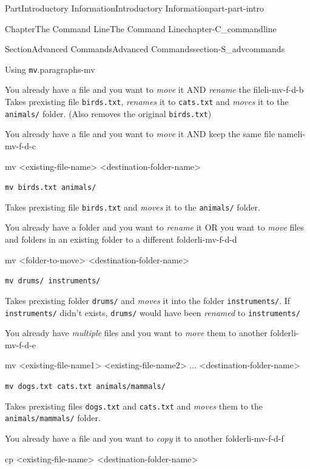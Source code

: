 \documentclass[oneside,10pt,]{book}
\newcommand{\mono}[1]{\texttt{#1}}
\begin{document}
\begin{partptx}{Part}{Introductory Information}{}{Introductory Information}{}{}{part-part-intro}
\begin{chapterptx}{Chapter}{The Command Line}{}{The Command Line}{}{}{chapter-C_commandline}
\begin{sectionptx}{Section}{Advanced Commands}{}{Advanced Commands}{}{}{section-S_advcommands}
\begin{paragraphs}{Using \mono{mv}.}{paragraphs-mv}
\begin{descriptionlist}
\begin{dlinarrow}{You already have a file and you want to \emph{move} it AND \emph{rename} the file}{li-mv-f-d-b}
Takes prexisting file \mono{birds.txt}, \emph{renames} it to \mono{cats.txt} and \emph{moves} it to the \mono{animals/} folder. (Also removes the original \mono{birds.txt})%
\end{dlinarrow}%
\begin{dlinarrow}{You already have a file and you want to \emph{move} it AND keep the same file name}{li-mv-f-d-c}%
%
\begin{codedisplay}
mv <existing-file-name> <destination-folder-name>
\end{codedisplay}
%
\par
\mono{mv birds.txt animals/}%
\par
Takes prexisting file \mono{birds.txt} and \emph{moves} it to the \mono{animals/} folder.%
\end{dlinarrow}%
\begin{dlinarrow}{You already have a folder and you want to \emph{rename} it OR you want to \emph{move} files and folders in an existing folder to a different folder}{li-mv-f-d-d}%
%
\begin{codedisplay}
mv <folder-to-move> <destination-folder-name>
\end{codedisplay}
%
\par
\mono{mv drums/ instruments/}%
\par
Takes prexisting folder \mono{drums/} and \emph{moves} it into the folder \mono{instruments/}. If \mono{instruments/} didn't exists, \mono{drums/} would have been \emph{renamed} to \mono{instruments/}%
\end{dlinarrow}%
\begin{dlinarrow}{You already have \emph{multiple} files and you want to \emph{move} them to another folder}{li-mv-f-d-e}%
%
\begin{codedisplay}
mv <existing-file-name1> <existing-file-name2> ...
	<destination-folder-name>
\end{codedisplay}
%
\par
\mono{mv dogs.txt cats.txt animals/mammals/}%
\par
Takes prexisting files \mono{dogs.txt} and \mono{cats.txt} and \emph{moves} them to the \mono{animals/mammals/} folder.%
\end{dlinarrow}%
\begin{dlinarrow}{You already have a file and you want to \emph{copy} it to another folder}{li-mv-f-d-f}%
%
\begin{codedisplay}
cp <existing-file-name> <destination-folder-name>
\end{codedisplay}
%
\par

\end{dlinarrow}
\end{descriptionlist}
\end{paragraphs}
\end{sectionptx}
\end{chapterptx}
\end{partptx}
\end{document}
